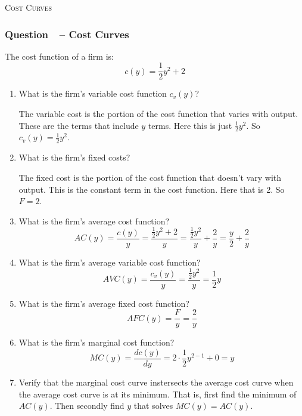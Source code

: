 \documentclass[12pt]{article}
\newcommand{\topic}[1]{\medskip\begin{center}\large\textsc{#1}\normalsize
  \end{center}}
\newcounter{question}[section]
\newcommand{\question}[1]{\refstepcounter{question}
  \subsubsection*{Question~\thequestion~-- #1}}
\newenvironment{subquestions}{
  \begin{enumerate}[label=(\roman*)]}{\end{enumerate}}
\begin{document}
\topic{Cost Curves}
\question{Cost Curves}
The cost function of a firm is:
\[
  c\left( y \right) = \frac{1}{2}y^2 + 2
\]
\begin{subquestions}
  \item What is the firm's variable cost function $c_v\left( y \right)$?

    \textcolor{solution-color}{
      The variable cost is the portion of the cost function that varies with
      output. These are the terms that include $y$ terms. Here this is just
      $\frac{1}{2}y^2$. So $c_v\left( y \right)=\frac{1}{2}y^2$.
    }
  \item What is the firm's fixed costs?

    \textcolor{solution-color}{
      The fixed cost is the portion of the cost function that doesn't vary with
      output. This is the constant term in the cost function. Here that is 2.
      So $F=2$.
    }
  \item What is the firm's average cost function?
    \textcolor{solution-color}{
      \[
        AC\left( y \right)=\frac{c\left( y
        \right)}{y}=\frac{\frac{1}{2}y^2+2}{y} =
        \frac{\frac{1}{2}y^2}{y} + \frac{2}{y}=
        \frac{y}{2} +
        \frac{2}{y}
      \]
    }
  \item What is the firm's average variable cost function?
    \textcolor{solution-color}{
      \[
        AVC\left( y \right)=\frac{c_v\left( y
        \right)}{y}=\frac{\frac{1}{2}y^2}{y} =
        \frac{1}{2}y
      \]
    }
  \item What is the firm's average fixed cost function?
    \textcolor{solution-color}{
      \[
        AFC\left( y \right)=\frac{F}{y}=\frac{2}{y}
      \]
    }
  \item What is the firm's marginal cost function?
    \textcolor{solution-color}{
      \[
        MC\left( y \right)=\frac{d c\left( y \right)}{dy}=2\cdot
        \frac{1}{2}y^{2-1} + 0 = y
      \]
    }
  \item Verify that the marginal cost curve instersects the average cost curve
    when the average cost curve is at its minimum. That is, first find the
    minimum of $AC\left( y \right)$. Then secondly find $y$ that solves
    $MC\left( y \right)=AC\left( y \right)$.


\end{subquestions}
\end{document}
